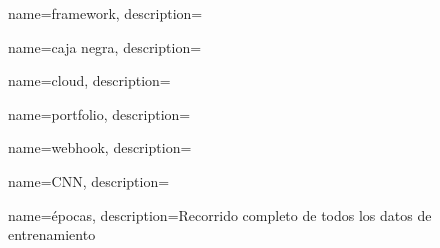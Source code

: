 {
    name=framework,
    description={}
}

{
    name=caja negra,
    description={}
}

{
    name=cloud,
    description={}
}

{
    name=portfolio,
    description={}
}

{
    name=webhook,
    description={}
}

{
    name=CNN,
    description={}
}

{
    name=épocas,
    description={Recorrido completo de todos los datos de entrenamiento}
}
